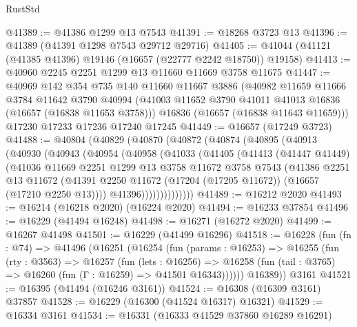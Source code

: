 \begin{lexlean}{RustStd}
\begin{coremodule}
@41389 := @41386 @1299 @13 @7543
@41391 := @18268 @3723 @13
@41396 := @41389 (@41391 @1298 @7543 @29712 @29716)
@41405 := @41044 (@41121 (@41385 @41396) @19146 (@16657 (@22777 @2242 @18750)) @19158)
@41413 := @40960 @2245 @2251 @1299 @13 @11660 @11669 @3758 @11675
@41447 := @40969
    @142
    @354
    @735
    @140
    @11660
    @11667
    @3886
    (@40982
      @11659
      @11666
      @3784
      @11642
      @3790
      @40994
      (@41003 @11652 @3790 @41011 @41013 @16836 (@16657 (@16838 @11653 @3758)))
      @16836
      (@16657 (@16838 @11643 @11659)))
    @17230
    @17233
    @17236
    @17240
    @17245
@41449 := @16657 (@17249 @3723)
@41488 := @40804
    (@40829
      (@40870
        (@40872
          (@40874
            (@40895
              (@40913
                (@40930
                  (@40943
                    (@40954
                      (@40958
                        (@41033
                          (@41405
                            (@41413
                              (@41447 @41449)
                              (@41036
                                @11669
                                @2251
                                @1299
                                @13
                                @3758
                                @11672
                                @3758
                                @7543
                                (@41386
                                  @2251
                                  @13
                                  @11672
                                  (@41391
                                    @2250
                                    @11672
                                    (@17204 (@17205 @11672))
                                    (@16657 (@17210 @2250 @13))))
                                @41396))))))))))))))
@41489 := @16212 @2020
@41493 := @16214 (@16218 @2020) (@16224 @2020)
@41494 := @16233 @37854
@41496 := @16229 (@41494 @16248)
@41498 := @16271 (@16272 @2020)
@41499 := @16267 @41498
@41501 := @16229 (@41499 @16296)
@41518 := @16228
    (fun (fn : @74) =>
    @41496
      (@16251
        (@16254
          (fun (params : @16253) =>
          @16255
            (fun (rty : @3563) =>
            @16257
              (fun (lets : @16256) =>
              @16258 (fun (tail : @3765) => @16260 (fun (Γ : @16259) => @41501 @16343))))))
        @16389))
    @3161
@41521 := @16395 (@41494 (@16246 @3161))
@41524 := @16308 (@16309 @3161) @37857
@41528 := @16229 (@16300 (@41524 @16317) @16321)
@41529 := @16334 @3161
@41534 := @16331 (@16333 @41529 @37860 @16289 @16291)

\end{coremodule}
\end{lexlean}
